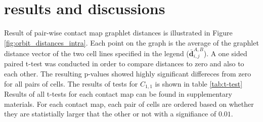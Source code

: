 \documentclass[a4,center,fleqn]{NAR}
\begin{document}
\section{results and discussions}

Result of pair-wise contact map graphlet distances is
illustrated in Figure \ref{fig:orbit_distances_intra}.
Each point on the graph is the
average of the graphlet distance vector 
of the two cell lines specified in the legend
($\bar{\mathbf{d}}^{\scriptscriptstyle A,B}_{i,j}$).
 A one sided paired t-test
was conducted in order to compare distances to
zero and also to each other. 
The resulting p-values showed highly 
significant differeces from zero for all pairs of
cells. The results of tests for $C_{1,1}$ 
is shown in table \ref{tab:t-test}
Results of all t-tests for each
contact map can be found in supplementary materials.
For each contact map, each pair of cells are
ordered based on whether they are statistially
larger that the other or not with a signifiance
of $0.01$.
\end{document}
